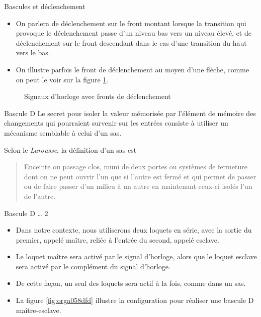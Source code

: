 \documentclass[presentation]{beamer}
\begin{document}
\begin{frame}[label={sec:org427c69d}]{Bascules et déclenchement}
\begin{itemize}
\item On parlera de déclenchement sur le \alert{front montant} lorsque la transition qui provoque le déclenchement passe d'un niveau bas vers un niveau élevé, et de déclenchement sur le \alert{front descendant} dans le cas d'une transition du haut vers le bas.

\item On illustre parfois le front de déclenchement au moyen d'une flèche, comme on peut le voir sur la figure \ref{fig:orgac077e5}.
\end{itemize}


\begin{figure}[htbp]
\centering

\caption{\label{fig:orgac077e5}Signaux d'horloge avec fronts de déclenchement}
\end{figure}
\end{frame}

\begin{frame}[label={sec:orgf193eef}]{Bascule D}
Le secret pour isoler la valeur mémorisée par l'élément de mémoire des changements qui pourraient survenir sur les entrées consiste à utiliser un mécanisme semblable à celui d'un sas.

Selon le \emph{Larousse}, la définition d'un sas est

\begin{quote}
Enceinte ou passage clos, muni de deux portes ou systèmes de fermeture
dont on ne peut ouvrir l'un que si l'autre est fermé et qui permet de
passer ou de faire passer d'un milieu à un autre en maintenant ceux-ci
isolés l'un de l'autre.
\end{quote}
\end{frame}

\begin{frame}[label={sec:org7dd8546}]{Bascule D \ldots{} 2}
\begin{itemize}
\item Dans notre contexte, nous utiliserons deux loquets en série, avec la sortie du premier, appelé \alert{maître}, reliée à l'entrée du second, appelé \alert{esclave}.

\item Le loquet maître sera activé par le signal d'horloge, alors que le loquet esclave sera activé par le complément du signal d'horloge.

\item De cette façon, un seul des loquets sera actif à la fois, comme dans un sas.

\item La figure \ref{fig:orga058dfd} illustre la configuration pour réaliser une bascule D maître-esclave.
\end{itemize}
\end{frame}
\end{document}
